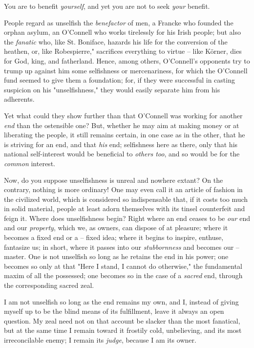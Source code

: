 \documentclass[a4paper]{book}
\begin{document}
You are to benefit \textit{yourself}, and yet you are not to seek 
\textit{your} benefit.

People regard as unselfish the \textit{benefactor} of men, a Francke who 
founded the orphan asylum, an O'Connell who works tirelessly for his Irish 
people; but also the \textit{fanatic} who, like St. Boniface, hazards his life 
for the conversion of the heathen, or, like Robespierre,"{} sacrifices 
everything to virtue -- like K\"orner, dies for God, king, and fatherland. 
Hence, among others, O'Connell's opponents try to trump up against him some 
selfishness or mercenariness, for which the O'Connell fund seemed to give them 
a foundation; for, if they were successful in casting suspicion on his 
"{}unselfishness,"{} they would easily separate him from his adherents.

Yet what could they show further than that O'Connell was working for another 
\textit{end} than the ostensible one? But, whether he may aim at making money 
or at liberating the people, it still remains certain, in one case as in the 
other, that he is striving for an end, and that \textit{his} end; selfishness 
here as there, only that his national self-interest would be beneficial to 
\textit{others too}, and so would be for the \textit{common} interest.

Now, do you suppose unselfishness is unreal and nowhere extant? On the 
contrary, nothing is more ordinary! One may even call it an article of fashion 
in the civilized world, which is considered so indispensable that, if it costs 
too much in solid material, people at least adorn themselves with its tinsel 
counterfeit and feign it. Where does unselfishness begin? Right where an end 
ceases to be \textit{our} end and our \textit{property}, which we, as owners, 
can dispose of at pleasure; where it becomes a fixed end or a -- fixed idea; 
where it begins to inspire, enthuse, fantasize us; in short, where it passes 
into our \textit{stubbornness} and becomes our -- master. One is not unselfish 
so long as he retains the end in his power; one becomes so only at that 
"{}Here I stand, I cannot do otherwise,"{} the fundamental maxim of all the 
possessed; one becomes so in the case of a \textit{sacred} end, through the 
corresponding sacred zeal.

I am not unselfish so long as the end remains my own, and I, instead of giving 
myself up to be the blind means of its fulfillment, leave it always an open 
question. My zeal need not on that account be slacker than the most fanatical, 
but at the same time I remain toward it frostily cold, unbelieving, and its 
most irreconcilable enemy; I remain its \textit{judge}, because I am its 
owner.
\end{document}
